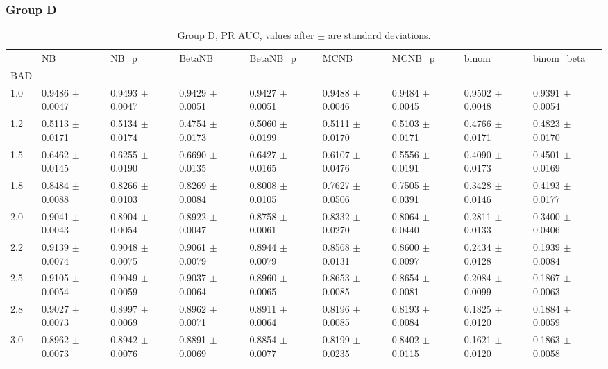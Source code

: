 \subsubsection*{Group D}
\begin{table}[H]
\centering
\begin{adjustbox}{max width=\linewidth}
\begin{tabular}{lllllllll}
\toprule
 & NB & NB\_p & BetaNB & BetaNB\_p & MCNB & MCNB\_p & binom & binom\_beta \\
BAD &  &  &  &  &  &  &  &  \\
\midrule
1.0 & 0.9486 $\pm$ 0.0047 & 0.9493 $\pm$ 0.0047 & 0.9429 $\pm$ 0.0051 & 0.9427 $\pm$ 0.0051 & 0.9488 $\pm$ 0.0046 & 0.9484 $\pm$ 0.0045 & 0.9502 $\pm$ 0.0048 & 0.9391 $\pm$ 0.0054 \\
1.2 & 0.5113 $\pm$ 0.0171 & 0.5134 $\pm$ 0.0174 & 0.4754 $\pm$ 0.0173 & 0.5060 $\pm$ 0.0199 & 0.5111 $\pm$ 0.0170 & 0.5103 $\pm$ 0.0171 & 0.4766 $\pm$ 0.0171 & 0.4823 $\pm$ 0.0170 \\
1.5 & 0.6462 $\pm$ 0.0145 & 0.6255 $\pm$ 0.0190 & 0.6690 $\pm$ 0.0135 & 0.6427 $\pm$ 0.0165 & 0.6107 $\pm$ 0.0476 & 0.5556 $\pm$ 0.0191 & 0.4090 $\pm$ 0.0173 & 0.4501 $\pm$ 0.0169 \\
1.8 & 0.8484 $\pm$ 0.0088 & 0.8266 $\pm$ 0.0103 & 0.8269 $\pm$ 0.0084 & 0.8008 $\pm$ 0.0105 & 0.7627 $\pm$ 0.0506 & 0.7505 $\pm$ 0.0391 & 0.3428 $\pm$ 0.0146 & 0.4193 $\pm$ 0.0177 \\
2.0 & 0.9041 $\pm$ 0.0043 & 0.8904 $\pm$ 0.0054 & 0.8922 $\pm$ 0.0047 & 0.8758 $\pm$ 0.0061 & 0.8332 $\pm$ 0.0270 & 0.8064 $\pm$ 0.0440 & 0.2811 $\pm$ 0.0133 & 0.3400 $\pm$ 0.0406 \\
2.2 & 0.9139 $\pm$ 0.0074 & 0.9048 $\pm$ 0.0075 & 0.9061 $\pm$ 0.0079 & 0.8944 $\pm$ 0.0079 & 0.8568 $\pm$ 0.0131 & 0.8600 $\pm$ 0.0097 & 0.2434 $\pm$ 0.0128 & 0.1939 $\pm$ 0.0084 \\
2.5 & 0.9105 $\pm$ 0.0054 & 0.9049 $\pm$ 0.0059 & 0.9037 $\pm$ 0.0064 & 0.8960 $\pm$ 0.0065 & 0.8653 $\pm$ 0.0085 & 0.8654 $\pm$ 0.0081 & 0.2084 $\pm$ 0.0099 & 0.1867 $\pm$ 0.0063 \\
2.8 & 0.9027 $\pm$ 0.0073 & 0.8997 $\pm$ 0.0069 & 0.8962 $\pm$ 0.0071 & 0.8911 $\pm$ 0.0064 & 0.8196 $\pm$ 0.0085 & 0.8193 $\pm$ 0.0084 & 0.1825 $\pm$ 0.0120 & 0.1884 $\pm$ 0.0059 \\
3.0 & 0.8962 $\pm$ 0.0073 & 0.8942 $\pm$ 0.0076 & 0.8891 $\pm$ 0.0069 & 0.8854 $\pm$ 0.0077 & 0.8199 $\pm$ 0.0235 & 0.8402 $\pm$ 0.0115 & 0.1621 $\pm$ 0.0120 & 0.1863 $\pm$ 0.0058 \\
\bottomrule
\end{tabular}

\end{adjustbox}
\caption{Group D, PR AUC, values after $\pm$ are standard deviations.}
\end{table}

